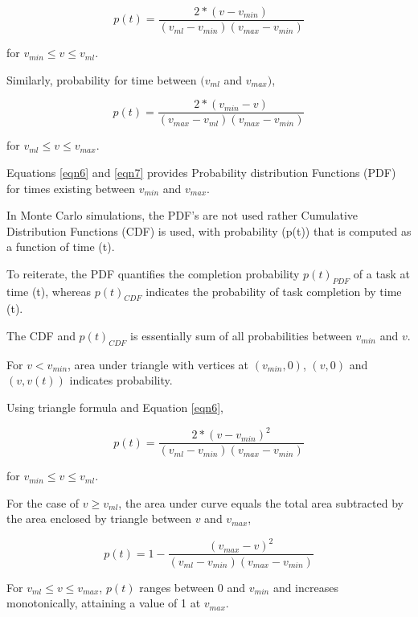 \begin{equation}
p(t)  = \frac{2* (v - v_{min})}{ (v_{ml} - v_{min}) (v_{max} - v_{min}) } 
\label{eqn6}
\end{equation}

for $ v_{min} \leqslant v \leqslant v_{ml}$.

Similarly, probability for time between $(v_{ml}$ and $ v_{max})$,

\begin{equation}
p(t)  = \frac{2* (v_{min} - v)}{ (v_{max} - v_{ml}) (v_{max} - v_{min}) } 
\label{eqn7}
\end{equation}

for $ v_{ml} \leqslant v \leqslant v_{max}$.

Equations \ref{eqn6} and \ref{eqn7} provides Probability distribution Functions (PDF) for times existing between $v_{min}$ and $v_{max}$. 


In Monte Carlo simulations, the PDF's are not used rather Cumulative Distribution Functions (CDF) is used, with probability (p(t)) that is computed as a function of time (t).

To reiterate, the PDF quantifies the completion probability $p(t)_{PDF}$ of a task at time (t), whereas $p(t)_{CDF}$ indicates the probability of task completion by time (t).

The CDF and $p(t)_{CDF}$ is essentially sum of all probabilities between $v_{min}$ and $v$. 


For $ v < v_{min}$, area under triangle with vertices at $(v_{min}, 0)$, $(v, 0)$ and $(v, v(t))$ indicates probability.

Using triangle formula and Equation \ref{eqn6}, 

\begin{equation}
p(t)  = \frac{2* (v - v_{min})^{2}}{ (v_{ml} - v_{min}) (v_{max} - v_{min}) } 
\label{eqn8}
\end{equation}

for $ v_{min} \leqslant v \leqslant v_{ml}$.

For the case of $ v \geqslant v_{ml}$, the area under curve equals the total area subtracted by the area enclosed by triangle between $v$ and $v_{max}$,

\begin{equation}
p(t)  = 1 -  \frac{(v_{max} - v)^{2}}{ (v_{ml} - v_{min}) (v_{max} - v_{min}) } 
\label{eqn9}
\end{equation}

For $ v_{ml} \leqslant v \leqslant v_{max}$, $p(t)$ ranges between 0 and $v_{min}$ and increases monotonically, attaining a value of 1 at $v_{max}$. 

